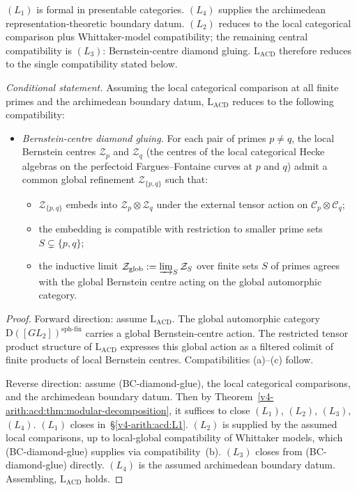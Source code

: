 \((L_{1})\) is formal in presentable categories.  \((L_{4})\) supplies
the archimedean representation-theoretic boundary datum.
\((L_{2})\) reduces to the local categorical comparison plus
Whittaker-model compatibility; the remaining central compatibility is
\((L_{3})\): Bernstein-centre diamond gluing.
\(\mathrm{L}_{\mathrm{ACD}}\) therefore reduces to the single
compatibility stated below.

\begin{theorem}
\label{v4-arith:acd:thm:final-reduction}
\emph{Conditional statement.} Assuming the local categorical
comparison at all finite primes and the archimedean boundary datum,
\(\mathrm{L}_{\mathrm{ACD}}\) reduces to the following compatibility:
\begin{itemize}
\item[\textbf{(BC-diamond-glue)}] \emph{Bernstein-centre diamond
gluing.} For each pair of primes \(p\neq q\), the local Bernstein
centres \(\mathcal{Z}_{p}\) and \(\mathcal{Z}_{q}\) (the centres of the
local categorical Hecke algebras on the perfectoid Fargues--Fontaine
curves at \(p\) and \(q\)) admit a common global refinement
\(\mathcal{Z}_{\{p,q\}}\) such that:
\begin{itemize}
\item[(a)] \(\mathcal{Z}_{\{p,q\}}\) embeds into
\(\mathcal{Z}_{p}\otimes\mathcal{Z}_{q}\) under the external tensor
action on \(\mathcal{C}_{p}\otimes\mathcal{C}_{q}\);
\item[(b)] the embedding is compatible with restriction to smaller
prime sets \(S\subsetneq\{p,q\}\);
\item[(c)] the inductive limit
\(\mathcal{Z}_{\mathrm{glob}}:=\varinjlim_{S}\mathcal{Z}_{S}\) over
finite sets \(S\) of primes agrees with the global Bernstein centre
acting on the global automorphic category.
\end{itemize}
\end{itemize}
\end{theorem}

\begin{proof}
Forward direction: assume \(\mathrm{L}_{\mathrm{ACD}}\). The global
automorphic category \(\mathrm{D}([GL_{2}])^{\mathrm{sph\text{-}fin}}\)
carries a global Bernstein-centre action. The restricted tensor
product structure of \(\mathrm{L}_{\mathrm{ACD}}\) expresses this
global action as a filtered colimit of finite products of local
Bernstein centres. Compatibilities (a)--(c) follow.

Reverse direction: assume (BC-diamond-glue), the local categorical
comparisons, and the archimedean boundary datum. Then by
Theorem~\ref{v4-arith:acd:thm:modular-decomposition}, it suffices to close
\((L_{1})\), \((L_{2})\), \((L_{3})\), \((L_{4})\). \((L_{1})\) closes
in~\S\ref{v4-arith:acd:L1}. \((L_{2})\) is supplied
by the assumed local comparisons, up to local-global compatibility of
Whittaker models, which (BC-diamond-glue) supplies via
compatibility~(b). \((L_{3})\) closes from (BC-diamond-glue) directly.
\((L_{4})\) is the assumed archimedean boundary datum. Assembling,
\(\mathrm{L}_{\mathrm{ACD}}\) holds.
\end{proof}

